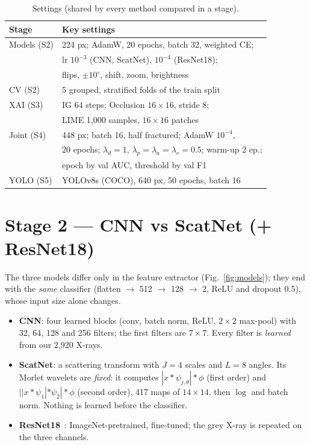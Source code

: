 \documentclass[conference]{IEEEtran}
\begin{document}
\begin{table}[t]
\centering
\caption{Settings (shared by every method compared in a stage).}
\label{tab:budget}
\renewcommand{\arraystretch}{1.12}
\begin{tabular}{ll}
\toprule
Stage & Key settings \\
\midrule
Models (S2)   & 224 px; AdamW, 20 epochs, batch 32, weighted CE; \\
              & lr $10^{-3}$ (CNN, ScatNet), $10^{-4}$ (ResNet18); \\
              & flips, $\pm10^\circ$, shift, zoom, brightness \\
CV (S2)       & 5 grouped, stratified folds of the train split \\
XAI (S3)      & IG 64 steps; Occlusion $16\times16$, stride 8; \\
              & LIME 1,000 samples, $16\times16$ patches \\
Joint (S4)    & 448 px; batch 16, half fractured; AdamW $10^{-4}$, \\
              & 20 epochs; $\lambda_d{=}1$, $\lambda_p{=}\lambda_a{=}\lambda_e{=}0.5$; warm-up 2 ep.; \\
              & epoch by val AUC, threshold by val F1 \\
YOLO (S5)     & YOLOv8s (COCO), 640 px, 50 epochs, batch 16 \\
\bottomrule
\end{tabular}
\end{table}

\section{Stage 2 --- CNN vs ScatNet (+ ResNet18)}
\label{sec:models}
The three models differ only in the feature extractor (Fig.~\ref{fig:models}); they end with the \emph{same}
classifier (flatten $\to$ 512 $\to$ 128 $\to$ 2, ReLU and dropout 0.5), whose input size alone changes.
\begin{itemize}
\item \textbf{CNN}: four learned blocks (conv, batch norm, ReLU, $2\times2$ max-pool) with 32, 64, 128 and 256
filters; the first filters are $7\times7$. Every filter is \emph{learned} from our 2,920 X-rays.
\item \textbf{ScatNet}: a scattering transform with $J{=}4$ scales and $L{=}8$ angles. Its Morlet wavelets are
\emph{fixed}: it computes $|x\ast\psi_{j,\theta}|\ast\phi$ (first order) and $||x\ast\psi_1|\ast\psi_2|\ast\phi$ (second
order), 417 maps of $14\times14$, then $\log$ and batch norm. Nothing is learned before the classifier.
\item \textbf{ResNet18}~\cite{he2016resnet}: ImageNet-pretrained, fine-tuned; the grey X-ray is repeated on the three
channels.
\end{itemize}
\end{document}
